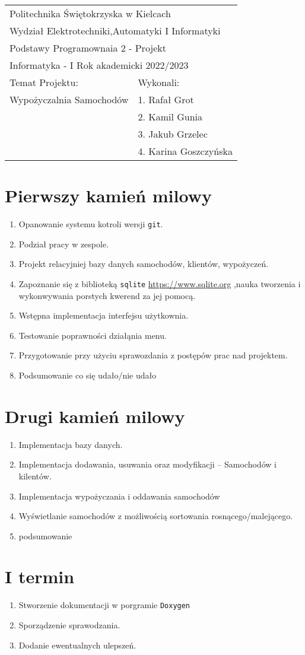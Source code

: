 \documentclass[11pt]{article}
\author{placeholder}
\date{\today}
\title{}
\begin{document}
\begin{center}
\begin{tabular}{|l|l|}
\hline
\multicolumn{2}{|l|}{Politechnika Świętokrzyska w Kielcach} \\
\multicolumn{2}{|l|}{Wydział Elektrotechniki,Automatyki I Informatyki} \\
\hline
\multicolumn{2}{|l|}{Podstawy Programownaia 2 - Projekt} \\
\multicolumn{2}{|l|}{Informatyka - I Rok akademicki 2022/2023} \\
\hline
Temat Projektu: & Wykonali: \\
Wypożyczalnia Samochodów & 1. Rafał Grot \\
 & 2. Kamil Gunia \\
 & 3. Jakub Grzelec \\
 & 4. Karina Goszczyńska \\
\hline
\end{tabular}
\end{center}
\section{Pierwszy kamień milowy}
\label{sec:org5c5810a}
\begin{enumerate}
\item Opanowanie systemu kotroli wersji \texttt{git}.
\item Podział pracy w zespole.
\item Projekt relacyjniej bazy danych samochodów, klientów, wypożyczeń.
\item Zapoznanie się z biblioteką \texttt{sqlite} \url{https://www.sqlite.org} ,nauka tworzenia i wykonwywania porstych kwerend za jej pomocą.
\item Wstępna implementacja interfejsu użytkownia.
\item Testowanie poprawności działąnia menu.
\item Przygotowanie przy użyciu sprawozdania z postępów prac nad projektem.
\item Podsumowanie co się udało/nie udało
\end{enumerate}
\section{Drugi kamień milowy}
\label{sec:orgc71af1c}
\begin{enumerate}
\item Implementacja bazy danych.
\item Implementacja dodawania, usuwania oraz modyfikacji -- Samochodów i kilentów.
\item Implementacja wypożyczania i oddawania samochodów
\item Wyświetlanie samochodów z możliwością sortowania rosnącego/malejącego.
\item podsumowanie
\end{enumerate}
\section{I termin}
\label{sec:orgd05d757}
\begin{enumerate}
\item Stworzenie dokumentacji w porgramie \texttt{Doxygen}
\item Sporządzenie sprawodzania.
\item Dodanie ewentualnych ulepszeń.
\end{enumerate}
\end{document}
